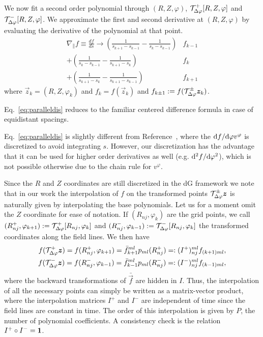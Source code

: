 We now fit a second order polynomial through $(R,Z,\varphi)$, $\mathcal T^+_{\Delta\varphi} [R,Z,\varphi]$ and $\mathcal T^-_{\Delta\varphi}[R,Z,\varphi]$. We approximate the first and second derivative at $(R,Z,\varphi)$ by evaluating the derivative of the
polynomial at that point.
\begin{align} \label{eq:paralleldis}
    \nabla_\parallel f \equiv \frac{df}{ds}
    \rightarrow
    \left(\frac{ 1}{s_{k+1}-s_{k-1}} - \frac{1}{s_k - s_{k-1}}\right) &f_{k-1}  \nonumber\\
    +\left(\frac{ 1}{s_{k}-s_{k-1}} - \frac{1}{s_{k+1} - s_{k}}\right) &f_k\nonumber\\
    +\left(\frac{ 1}{s_{k+1}-s_{k}} - \frac{1}{s_{k+1} - s_{k-1}}\right) &f_{k+1}
\end{align}
where $\vec z_k = (R,Z,\varphi_k)$ and $f_k = f(\vec z_k)$
and $f_{k\pm 1} := f(\mathcal T^\pm_{\Delta\varphi} {\boldsymbol{z}}_k)$.
\begin{tcolorbox}[title=Note]
Eq.~\eqref{eq:paralleldis} reduces to
the familiar centered difference formula in case of equidistant spacings.
\end{tcolorbox}
Eq.~\eqref{eq:paralleldis} is slightly different from Reference~\cite{Hariri2014}, where the $\mathrm{d} f/\mathrm{d}\varphi v^\varphi$ is discretized to avoid integrating $s$.
However, our discretization has the advantage that it can be used for higher
order derivatives as well (e.g. $\mathrm{d}^2f/\mathrm{d} \varphi^2$), which is not possible otherwise due to the chain rule
for $v^\varphi$.

Since the $R$ and $Z$ coordinates are still discretized in the dG framework we note that in our work
the interpolation of $f$ on the transformed points $\mathcal T^\pm_{\Delta\varphi}{\boldsymbol{z}}$
is naturally given by interpolating the base polynomials.
Let us for a moment omit the $Z$ coordinate for ease of notation.
If $(R_{nj}, \varphi_k)$ are the grid points,
we call $(R^+_{nj}, \varphi_{k+1}) := \mathcal T^+_{\Delta\varphi}[R_{nj}, \varphi_k]$ and
$(R_{nj}^-, \varphi_{k-1}) := \mathcal T^-_{\Delta\varphi}[R_{nj}, \varphi_k]$ the transformed coordinates along
the field lines. We then have
\begin{subequations}
\begin{align}
    f(\mathcal T^+_{\Delta\varphi}{\boldsymbol{z}}) = f( R^+_{nj}, \varphi_{k+1}) = \bar f_{k+1}^{ml}p_{ml}(R^+_{nj}) =: (I^+)_{nj}^{ml}f_{(k+1)ml} , \\
    f(\mathcal T^-_{\Delta\varphi}{\boldsymbol{z}}) = f( R^-_{nj}, \varphi_{k-1}) = \bar f_{k-1}^{ml}p_{ml}(R^-_{nj}) =: (I^-)_{nj}^{ml}f_{(k-1)ml} , 
\end{align}
\label{eq:interpolation}
\end{subequations}
where the backward transformations of $\bar{ \vec f}$ are hidden in $I$.
Thus, the interpolation of all the necessary points can simply be written as a matrix-vector product, where the interpolation matrices $I^+$  and $I^-$ are independent of time since
the field lines are constant in time. The order of this interpolation is given by $P$, the number of polynomial coefficients.
A consistency check is the relation $I^+\circ I^- = \mathbf{1}$.

